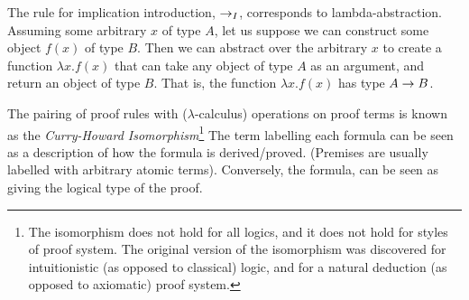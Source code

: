 The rule for implication introduction, $\to_I$,
 corresponds to lambda-abstraction.  Assuming some
arbitrary $x$ of type $A$, let us suppose we can construct some object
$f(x)$ of type $B$.  Then we can abstract over the arbitrary $x$ to
create a function $\lambda x.f(x)$ that can take any object of type
$A$ as an argument, and return an object of type $B$.  That is, the
function $\lambda x.f(x)$ has type $A\to B$.

The pairing of proof rules with ($\lambda$-calculus) operations on
proof terms is known as the {\em Curry-Howard Isomorphism}\footnote{The
isomorphism does not hold for all logics, and it does not hold for 
styles of proof system. The original version of the isomorphism was
discovered for intuitionistic (as opposed to classical) logic, and for
a natural deduction (as opposed to axiomatic) proof system.}  The term
labelling each formula can be seen as a description of how the formula is
derived/proved.  (Premises are usually labelled with arbitrary atomic terms).
Conversely, the formula, can be seen as giving the logical type of the proof.


